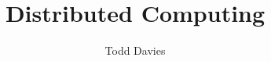 \newcommand{\coursename}{Distributed Computing}
\newcommand{\coursecode}{COMP28112}
\newcommand{\courseinfo}{}
\newcommand{\Author}{Todd Davies} 
\newcommand{\Title}{Distributed Computing}
\author{\Author}
\title{\Title}
